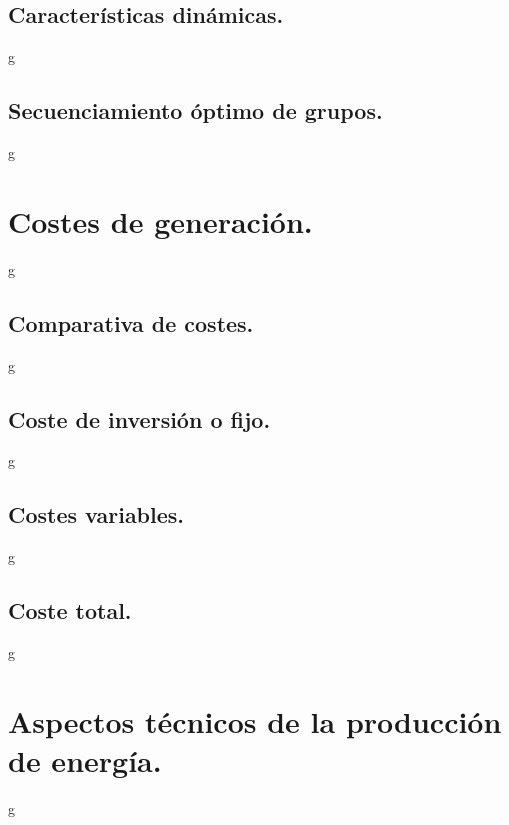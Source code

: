 \subsection{Características dinámicas.}
g
\subsection{Secuenciamiento óptimo de grupos.}
g
\section{Costes de generación.}
g
\subsection{Comparativa de costes.}
g
\subsection{Coste de inversión o fijo.}
g
\subsection{Costes variables.}
g
\subsection{Coste total.}
g
\section{Aspectos técnicos de la producción de energía.}
g